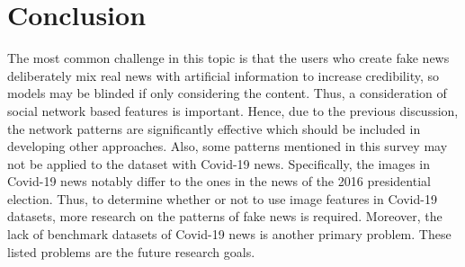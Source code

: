 \documentclass[sigconf ,nonacm]{acmart}
\begin{document}
\section{Conclusion}
The most common challenge in this topic is that the users who create fake news deliberately mix real news with artificial information to increase credibility, so models may be blinded if only considering the content. Thus, a consideration of social network based features is important. Hence, due to the previous discussion, the network patterns are significantly effective which should be included in developing other approaches. Also, some patterns mentioned in this survey may not be applied to the dataset with Covid-19 news. Specifically, the images in Covid-19 news notably differ to the ones in the news of the 2016 presidential election. Thus, to determine whether or not to use image features in Covid-19 datasets, more research on the patterns of fake news is required. Moreover, the lack of benchmark datasets of Covid-19 news is another primary problem. These listed problems are the future research goals.



\end{document}
